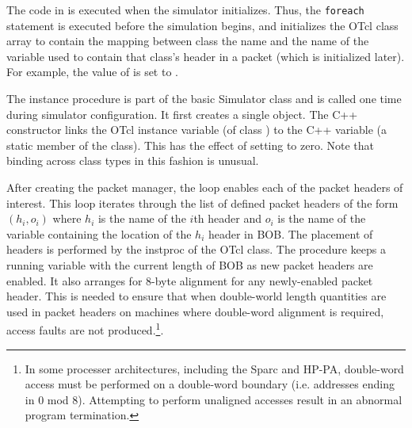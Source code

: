 The code in  is executed
when the simulator initializes.
Thus, the {\tt foreach} statement is executed before the
simulation begins, and initializes the OTcl class array
 to contain the mapping between class
the name and the name of the variable used to contain
that class's header in a packet (which is initialized later).
For example, the value of  is set to
.

The  instance procedure is part of the
basic Simulator class and is called one time during simulator
configuration.
It first creates a single  object.
The C++ constructor links the OTcl instance
variable  (of class )
to the C++ variable  (a static
member of the  class).
This has the effect of setting  to
zero.
Note that binding across class types in this fashion is
unusual.

\label{sec:configpacket}
After creating the packet manager, the 
loop enables each of the packet headers of interest.
This loop iterates through the list of defined
packet headers of the form
$(h_i, o_i)$ where $h_i$ is the name of the  $i$th header
and $o_i$ is the name of the variable containing the
location of the $h_i$ header in BOB.
The placement of headers is performed by the 
instproc of the  OTcl class.
The procedure keeps a running variable  with
the current length of BOB as new packet headers are enabled.
It also arranges for 8-byte alignment for any newly-enabled packet
header.
This is needed to ensure that when double-world length quantities
are used in packet headers on machines where double-word alignment
is required, access faults are not produced.\footnote{In
some processer architectures, including the
Sparc and HP-PA, double-word access must be performed on a double-word
boundary (i.e. addresses ending in 0 mod 8).  Attempting to perform
unaligned accesses result in an abnormal program termination.}.
